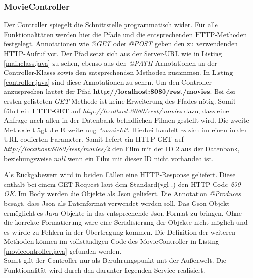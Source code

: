 \documentclass[fleqn,10.5pt,ngerman]{SelfArx}
\begin{document}
\subsubsection{MovieController}
Der Controller spiegelt die Schnittstelle programmatisch wider. Für alle Funktionalitäten werden hier die Pfade und die entsprechenden HTTP-Methoden festgelegt. Annotationen wie \textit{@GET} oder \textit{@POST} geben den zu verwendenden HTTP-Aufruf vor. Der Pfad setzt sich aus der Server-URL wie in Listing \ref{mainclass.java} zu sehen, ebenso aus den \textit{@PATH}-Annotationen an der Controller-Klasse sowie den entsprechenden Methoden zusammen. In Listing \ref{controller.java} sind diese Annotationen zu sehen. Um den Controller anzusprechen lautet der Pfad \textbf{http://localhost:8080/rest/movies}. Bei der ersten gelisteten \textit{GET}-Methode ist keine Erweiterung des Pfades nötig. Somit führt ein HTTP-GET auf \textit{http://localhost:8080/rest/movies} dazu, dass eine Anfrage nach allen in der Datenbank befindlichen Filmen gestellt wird. Die zweite Methode trägt die Erweiterung \textit{"movieId"}. Hierbei handelt es sich im einen in der URL codierten Parameter.  Somit liefert ein HTTP-GET auf \textit{http://localhost:8080/rest/movies/2} den Film mit der ID 2 aus der Datenbank, beziehungsweise \textit{null} wenn ein Film mit dieser ID nicht vorhanden ist. 

Als Rückgabewert wird in beiden Fällen eine HTTP-Response geliefert. Diese enthält bei einem GET-Request laut dem Standard(vgl .\cite{httpcodes}) den HTTP-Code \textit{200 OK}. Im Body werden die Objekte als Json geliefert. Die Annotation \textit{@Produces} besagt, dass Json als Datenformat verwendet werden soll. Das Gson-Objekt ermöglicht es Java-Objekte in das entsprechende Json-Format zu bringen. Ohne die korrekte Formatierung wäre eine Serialisierung der Objekte nicht möglich und es würde zu Fehlern in der Übertragung kommen. Die Definition der weiteren Methoden können im vollständigen Code des MovieController in Listing \ref{moviecontroller.java} gefunden werden. \\ Somit gilt der Controller nur als Berührungspunkt mit der Außenwelt. Die Funktionalität wird durch den darunter liegenden Service realisiert.
\end{document}
